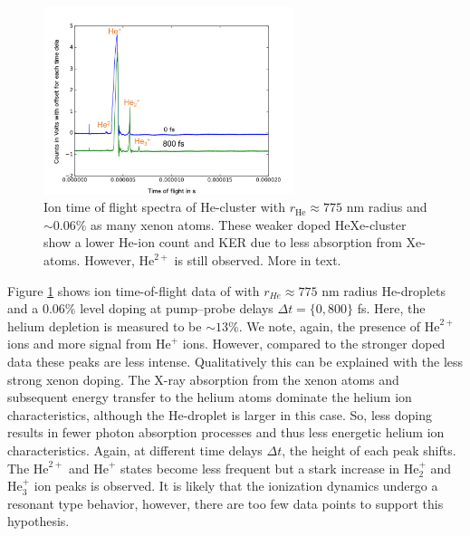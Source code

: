 \begin{figure}
 	\centering
 		\includegraphics[width=0.65\textwidth]{images/results/TOF-helium-xenon-cluster-13.png}
 	\caption[TOF spectra of HeXe-cluster with $\sim 0.06\%$ Xe-doping at various delays $\Delta t$.]{Ion time of flight spectra of He-cluster with $r_{\text{He}}\approx 775$ nm radius and $\sim 0.06\%$ as many xenon atoms. These weaker doped HeXe-cluster show a lower He-ion count and KER due to less absorption from Xe-atoms. However, $\text{He}^{2+}$ is still observed. More in text.}
 	\label{fig:TOF-helium-xenon-cluster-13}
\end{figure}
Figure \ref{fig:TOF-helium-xenon-cluster-13} shows ion time-of-flight data of with $r_{He}\approx 775$ nm radius He-droplets and a $0.06 \%$ level doping at pump--probe delays $\Delta t=\{0, 800\}$ fs. Here, the helium depletion is measured to be $\sim 13\%$. We note, again, the presence of $\text{He}^{2+}$ ions and more signal from $\text{He}^{+}$ ions. However, compared to the stronger doped data these peaks are less intense. Qualitatively this can be explained with the less strong xenon doping. The X-ray absorption from the xenon atoms and subsequent energy transfer to the helium atoms dominate the helium ion characteristics, although the He-droplet is larger in this case. So, less doping results in fewer photon absorption processes and thus less energetic helium ion characteristics. Again, at different time delays $\Delta t$, the height of each peak shifts. The $\text{He}^{2+}$ and $\text{He}^{+}$ states become less frequent but a stark increase in $\text{He}_{2}^{+}$ and $\text{He}_{3}^{+}$ ion peaks is observed. It is likely that the ionization dynamics undergo a resonant type behavior, however, there are too few data points to support this hypothesis.\\
